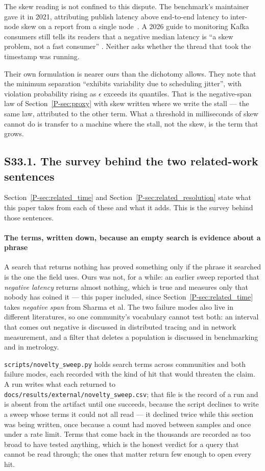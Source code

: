\documentclass[10pt,journal,onecolumn]{IEEEtran}
\newcommand{\mainModel}{\ref{P-sec:proxy}}           %
\newcommand{\mainRelatedTime}{\ref{P-sec:related_time}}    %
\newcommand{\mainRelatedRes}{\ref{P-sec:related_resolution}}     %
\begin{document}
The skew reading is not confined to this dispute. The benchmark's maintainer gave it in 2021,
attributing publish latency above end-to-end latency to inter-node skew on a report from a
single node~\cite{omb_issue216}. A 2026 guide to monitoring Kafka consumers still tells its
readers that a negative median latency is ``a skew problem, not a fast consumer''
\cite{hasija2026kafkalag}. Neither asks whether the thread that took the timestamp was
running.

Their own formulation is nearer ours than the dichotomy allows. They note that the minimum
separation ``exhibits variability due to scheduling jitter'', with violation probability
rising as $\epsilon$ exceeds its quantiles. That is the negative-span law of
Section~\mainModel{} with skew written where we write the stall --- the same law, attributed to the other
term. What a threshold in milliseconds of skew cannot do is transfer to a machine where the
stall, not the skew, is the term that grows.


\subsection{S33.1. The survey behind the two related-work sentences}
\label{sec:standing}

Section~\mainRelatedTime{} and Section~\mainRelatedRes{} state what this paper takes from
each of these and what it adds. This is the survey behind those sentences.

\paragraph{The terms, written down, because an empty search is evidence about a phrase}
A search that returns nothing has proved something only if the phrase it searched is the one
the field uses. Ours was not, for a while: an earlier sweep reported that
\emph{negative latency} returns almost nothing, which is true and measures only that nobody
has coined it --- this paper included, since Section~\mainRelatedTime{} takes
\emph{negative span} from Sharma et al. The two failure modes also live in different
literatures, so one community's vocabulary cannot test both: an interval that comes out
negative is discussed in distributed tracing and in network measurement, and a filter that
deletes a population is discussed in benchmarking and in metrology.

\texttt{scripts/novelty\_sweep.py} holds \sweepTerms{} search terms across
\sweepCommunities{} communities and both failure modes, each recorded with the kind of hit that
would threaten the claim. A run writes what each returned to
\texttt{docs/results/external/novelty\_sweep.csv}; that file is the record of a run and
is absent from the artifact until one succeeds, because the script declines to write a sweep
whose terms it could not all read --- it declined twice while this section was being written,
once because a count had moved between samples and once under a rate limit. Terms that come back in the
thousands are recorded as too broad to have tested anything, which is the honest verdict for a
query that cannot be read through; the ones that matter return few enough to open every hit.
\end{document}

